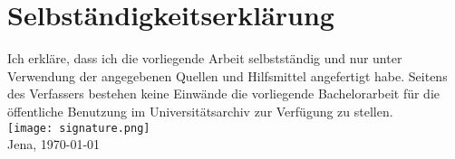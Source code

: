 \chapter{Selbständigkeitserklärung}
Ich erkläre, dass ich die vorliegende Arbeit selbstständig und nur unter Verwendung der angegebenen Quellen und Hilfsmittel angefertigt habe.
Seitens des Verfassers bestehen keine Einwände die vorliegende Bachelorarbeit für die öffentliche Benutzung im Universitätsarchiv zur Verfügung zu stellen.
\vspace{3mm}\\
\texttt{[image: signature.png]}
\vspace{3mm}\\
Jena, \today
